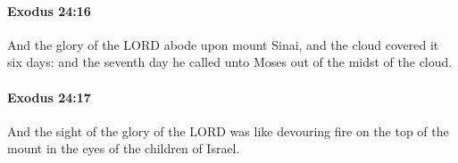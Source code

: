 		\paragraph{Exodus 24:16} %
			\label{EXODUS-24-16}

			And the glory of the LORD abode upon mount Sinai, and the cloud covered it six days: and the seventh day he called unto Moses out of the midst of the cloud.


		\paragraph{Exodus 24:17} %
			\label{EXODUS-24-17}

			And the sight of the glory of the LORD was like devouring fire on the top of the mount in the eyes of the children of Israel.


